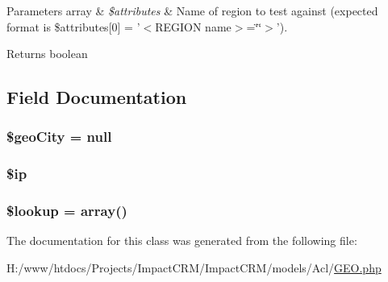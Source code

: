 \begin{DoxyParams}[1]{Parameters}
array & {\em \$attributes} & Name of region to test against (expected format is \$attributes\mbox{[}0\mbox{]} = '$<$REGION name$>$=\char`\"{}\char`\"{}$>$'). \\
\hline
\end{DoxyParams}
\begin{DoxyReturn}{Returns}
boolean 
\end{DoxyReturn}


\subsection{Field Documentation}
\hypertarget{classAcl__GEO_ad68212faa7abb0256e6be7d5234cd337}{
\subsubsection[{\$geoCity}]{\setlength{\rightskip}{0pt plus 5cm}\$geoCity = null}}
\label{classAcl__GEO_ad68212faa7abb0256e6be7d5234cd337}
\hypertarget{classAcl__GEO_a9a08c84edd46f257c94cdf8d443cc77d}{
\subsubsection[{\$ip}]{\setlength{\rightskip}{0pt plus 5cm}\$ip}}
\label{classAcl__GEO_a9a08c84edd46f257c94cdf8d443cc77d}
\hypertarget{classAcl__GEO_abfbf677bba4b657eb5425cdc21cdfbbc}{
\subsubsection[{\$lookup}]{\setlength{\rightskip}{0pt plus 5cm}\$lookup = array()}}
\label{classAcl__GEO_abfbf677bba4b657eb5425cdc21cdfbbc}


The documentation for this class was generated from the following file:\begin{DoxyCompactItemize}
\item 
H:/www/htdocs/Projects/ImpactCRM/ImpactCRM/models/Acl/\hyperlink{GEO_8php}{GEO.php}\end{DoxyCompactItemize}
